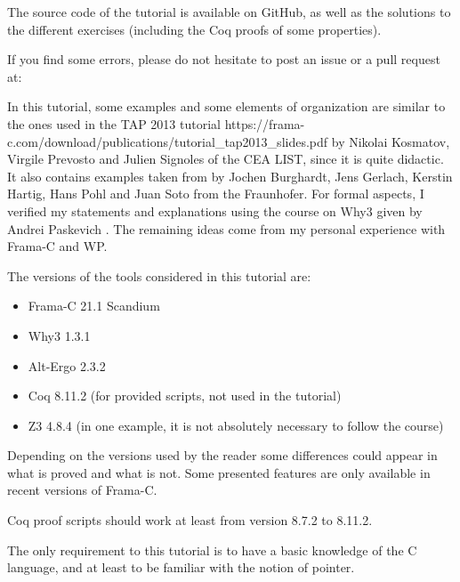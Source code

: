 \begin{Warning}
  The source code of
  the tutorial is available on GitHub, as well as the solutions to the
  different exercises (including the Coq proofs of some properties).

  If you find some errors, please do not hesitate to post an issue or
  a pull request at:

\end{Warning}


\begin{Information}
  In this tutorial, some examples and some elements of organization are
  similar to the ones used in the
  \externalLink
      {TAP 2013 tutorial}
      {https://frama-c.com/download/publications/tutorial_tap2013_slides.pdf}
  by Nikolai Kosmatov, Virgile Prevosto and Julien
  Signoles of the CEA LIST, since it is quite didactic. It also
  contains examples taken from
  \textit{}
  by Jochen Burghardt, Jens Gerlach, Kerstin Hartig, Hans Pohl and Juan
  Soto from the Fraunhofer. For formal aspects, I verified my statements and
  explanations using the course on Why3 given by Andrei Paskevich
  \textit{}.
  The remaining ideas come from my personal experience with Frama-C and WP.

  \horizontalLine

  The versions of the tools considered in this tutorial are:
  \begin{itemize}
  \item Frama-C 21.1 Scandium
  \item Why3 1.3.1
  \item Alt-Ergo 2.3.2
  \item Coq 8.11.2 (for provided scripts, not used in the tutorial)
  \item Z3 4.8.4 (in one example, it is not absolutely necessary to follow the course)
  \end{itemize}
  Depending on the versions used by the reader some differences could appear in
  what is proved and what is not. Some presented features are only available
  in recent versions of Frama-C.

  Coq proof scripts should work at least from version 8.7.2 to 8.11.2.

  \horizontalLine

  The only requirement to this tutorial is to have a basic knowledge of the C
  language, and at least to be familiar with the notion of pointer.
\end{Information}

